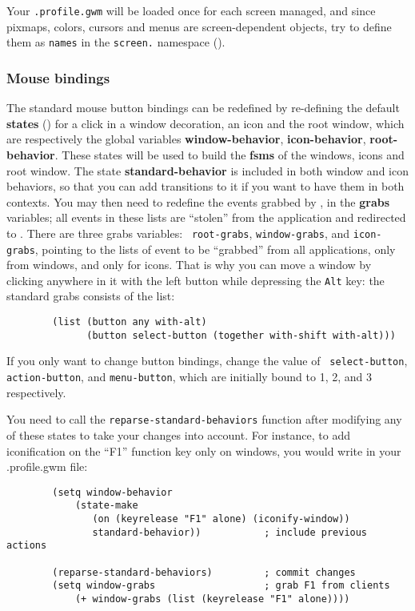 Your \verb".profile.gwm" will be loaded once for each screen
managed, and since pixmaps, colors, cursors and menus are screen-dependent
objects, try to define them as \verb"names" in the \verb"screen." namespace
().

\subsubsection{Mouse bindings}

The standard mouse button bindings can be redefined by re-defining the default
{\bf states} () for a click in a window decoration, an icon
and the root window, which are respectively the global variables {\bf
window-behavior}, {\bf icon-behavior}, {\bf root-behavior}. These states will
be used to build the {\bf fsms} of the windows, icons and root window. The
state {\bf standard-behavior} is included in both window and icon behaviors,
so that you can add transitions to it if you want to have them in both
contexts. You may then need to redefine the events grabbed by {\GWM}, in the
{\bf grabs} variables; all events in these lists are ``stolen'' from the
application and redirected to {\GWM}.  There are three grabs variables: {\tt
root-grabs}, {\tt window-grabs}, and {\tt icon-grabs}, pointing to the lists
of event to be ``grabbed'' from all applications, only from windows, and only
for icons.  That is why you can move a window by clicking anywhere in it with
the left button while depressing the {\tt Alt} key: the standard grabs
consists of the list:

{\exemplefont\begin{verbatim}
        (list (button any with-alt)
              (button select-button (together with-shift with-alt)))
\end{verbatim}}

If you only want to change button bindings, change the value of {\tt
select-button}, {\tt action-button}, and {\tt menu-button}, which are
initially bound to 1, 2, and 3 respectively.

You need to call the {\tt reparse-standard-behaviors} function after modifying
any of these states to take your changes into account. For instance, to add
iconification on the ``F1'' function key only on windows, you would write in
your .profile.gwm file:

{\exemplefont\begin{verbatim}
        (setq window-behavior
            (state-make
               (on (keyrelease "F1" alone) (iconify-window))
               standard-behavior))           ; include previous actions

        (reparse-standard-behaviors)         ; commit changes
        (setq window-grabs                   ; grab F1 from clients
            (+ window-grabs (list (keyrelease "F1" alone))))
\end{verbatim}}


